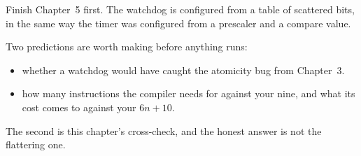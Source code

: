 Finish Chapter~5 first. The watchdog is configured from a table of scattered bits, in the same way
the timer was configured from a prescaler and a compare value.

Two predictions are worth making before anything runs:
\begin{itemize}
  \item whether a watchdog would have caught the atomicity bug from Chapter~3.
  \item how many instructions the compiler needs for  against your nine, and what
    its cost comes to against your $6n + 10$.
\end{itemize}
The second is this chapter's cross-check, and the honest answer is not the flattering one.







